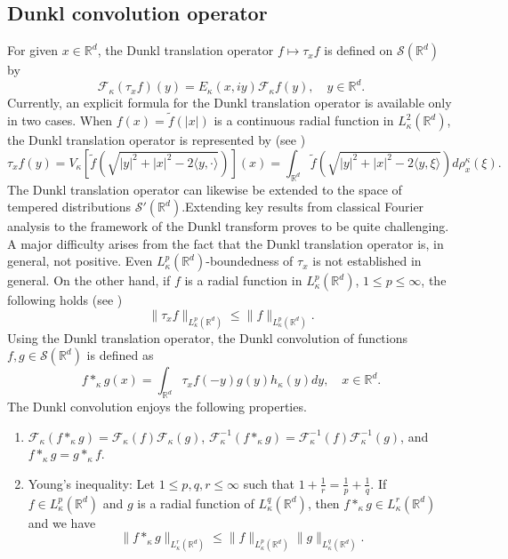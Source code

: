 \documentclass[a4paper,11pt, reqno]{amsart}
\theoremstyle{definition}
\theoremstyle{remark}
\numberwithin{equation}{section}
\begin{document}
	\subsection{Dunkl convolution operator}\label{sub5.3} For  given $x\in\mathbb{R}^{d}$, the Dunkl translation operator $f\mapsto \tau_x f$ is defined on $\mathcal{S}\left(\mathbb{R}^{d}\right)$ by
	\begin{equation*}
		\mathcal{F}_\kappa(\tau_x f)(y)=E_\kappa(x,iy)\mathcal{F}_\kappa f(y),\quad y\in\mathbb{R}^{d}.
	\end{equation*}
	Currently, an explicit formula for the Dunkl translation operator is available only in two cases. When $f(x)=\tilde{f}(|x|)$ is a continuous radial function in $L_\kappa^2(\mathbb{R}^{d})$, the Dunkl translation operator is represented by (see \cite{ros, Dai-Wang})
	\begin{equation} \label{translator}
		\tau_xf(y)=V_\kappa[\tilde{f}\left(\sqrt{|y|^2+|x|^2-2\langle y,\cdot\rangle}\right)](x)=\int_{\mathbb{R}^{d}}\tilde{f}\left(\sqrt{|y|^2+|x|^2-2\langle y,\xi\rangle}\right)d\rho^\kappa_x(\xi).
	\end{equation}
The Dunkl translation operator can likewise be extended to the space of tempered distributions $\mathcal{S}'\left(\mathbb{R}^{d}\right)$.Extending key results from classical Fourier analysis to the framework of the Dunkl transform proves to be quite challenging. A major difficulty arises from the fact that the Dunkl translation operator is, in general, not positive. Even $L_\kappa^p(\mathbb{R}^{d})$-boundedness of $\tau_x$ is not established in general. On the other hand, if  $f$ is a radial function in $L_\kappa^p(\mathbb{R}^{d})$, $1\leq p\leq \infty$, the following holds (see \cite{GIT2019, Thangavelu-Xu2005})
	\begin{equation*}
		\|\tau_xf\|_{L_\kappa^p(\mathbb{R}^{d})}\leq \|f\|_{L_\kappa^p(\mathbb{R}^{d})}.
	\end{equation*}
	Using the Dunkl translation operator,  the Dunkl convolution  of functions $f,g\in \mathcal{S}\left(\mathbb{R}^{d}\right)$ is defined as 
	\begin{equation*}
		f*_\kappa g(x)=\int_{\mathbb{R}^{d}}\tau_xf(-y)g(y)h_\kappa(y)dy, \quad x\in\mathbb{R}^{d}.
	\end{equation*}
	The Dunkl convolution enjoys the following properties.
	\begin{enumerate}
		\item  $\mathcal{F}_\kappa(f*_\kappa g)=\mathcal{F}_\kappa (f)\mathcal{F}_\kappa (g)$, $\mathcal{F}^{-1}_\kappa(f*_\kappa g)=\mathcal{F}^{-1}_\kappa (f)\mathcal{F}^{-1}_\kappa (g)$, and $f*_\kappa g=g*_\kappa f$.
		\item Young's inequality: Let $1\leq p,q,r\leq\infty$ such that $1+\frac{1}{r}=\frac{1}{p}+\frac{1}{q}$. If $f\in L^p_\kappa(\mathbb{R}^{d})$ and $g$ is a radial function of $L_\kappa^q(\mathbb{R}^{d})$, then $f*_\kappa g\in L_\kappa^r(\mathbb{R}^{d})$ and we have
		\begin{equation}\label{Young}
			\|f*_\kappa g\|_{L_\kappa^r(\mathbb{R}^{d})}\leq \|f\|_{L_\kappa^p(\mathbb{R}^{d})} \|g\|_{L_\kappa^q(\mathbb{R}^{d})}.
		\end{equation}
	\end{enumerate}
\end{document}
